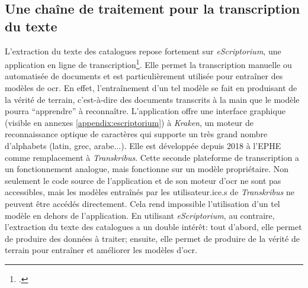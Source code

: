 \subsection{Une chaîne de traitement pour la transcription du texte}
L'extraction du texte des catalogues repose fortement sur \textit{eScriptorium}, une application en ligne de transcription\footcite{stokes_escriptorium_2021}. Elle permet la transcription manuelle ou automatisée de documents et est particulièrement utilisée pour entraîner des modèles de \gls{ocr}. En effet, l'entraînement d'un tel modèle se fait en produisant de la vérité de terrain, c'est-à-dire des documents transcrits à la main que le modèle pourra \enquote{apprendre} à reconnaître. L'application offre une interface graphique (visible en annexes \ref{appendix:escriptorium}) à \textit{Kraken}, un moteur de reconnaissance optique de caractères qui supporte un très grand nombre d'alphabets (latin, grec, arabe...). Elle est développée depuis 2018 à l'EPHE comme remplacement à \textit{Transkribus}. Cette seconde plateforme de transcription a un fonctionnement analogue, mais fonctionne sur un modèle propriétaire. Non seulement le code source de l'application et de son moteur d'\gls{ocr} ne sont pas accessibles, mais les modèles entraînés par les utilisateur.ice.s de \textit{Transkribus} ne peuvent être accédés directement. Cela rend impossible l'utilisation d'un tel modèle en dehors de l'application. En utilisant \textit{eScriptorium}, au contraire, l'extraction du texte des catalogues a un double intérêt: tout d'abord, elle permet de produire des données à traiter; ensuite, elle permet de produire de la vérité de terrain pour entraîner et améliorer les modèles d'\gls{ocr}.

